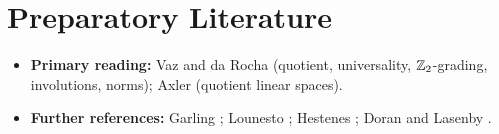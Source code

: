 \documentclass[11pt,a4paper]{article}
\begin{document}
\section{Preparatory Literature}
\label{sec:literature}

\begin{itemize}[itemsep=0.15em, topsep=0.25em]
  \item \textbf{Primary reading:} Vaz and da Rocha
    \cite[Secs.~3.1--3.3]{vazIntroductionCliffordAlgebras2016} (quotient,
    universality, $\mathbb{Z}_2$-grading, involutions, norms); Axler
    \cite[Sec.~3.E]{axlerLinearAlgebraDone2015} (quotient linear spaces).
  \item \textbf{Further references:} Garling
    \cite[Secs.~5.1--5.3, 5.6]{garlingCliffordAlgebrasIntroduction2011};
    Lounesto \cite[Chaps.~1--3]{lounestoCliffordAlgebrasSpinors2001};
    Hestenes \cite[Chaps.~1--2, Sec.~4-1]{hestenesNewFoundationsClassical2002};
    Doran and Lasenby \cite[Chaps.~1--2]{doranGeometricAlgebraPhysicists2013}.
\end{itemize}

{\renewcommand*{\bibfont}{\footnotesize}\setlength{\bibitemsep}{0.15\baselineskip}%
\printbibliography[title={References}]}
\end{document}
